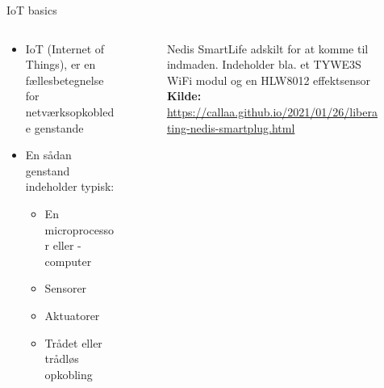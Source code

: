 \documentclass[aspectratio=169]{beamer}
\begin{document}
\begin{frame}{IoT basics}
\begin{columns}
	\begin{column}{0.6\textwidth}
		\begin{textBox}
			\begin{itemize}
				\item IoT (Internet of Things), er en fællesbetegnelse for netværksopkoblede genstande
				\item En sådan genstand indeholder typisk:
				\begin{itemize}
					\item En microprocessor eller -computer
					\item Sensorer
					\item Aktuatorer
					\item Trådet eller trådløs opkobling
				\end{itemize}
			\end{itemize}
		\end{textBox}
	\end{column}
	\begin{column}{0.4\textwidth}
		\centering
		\begin{figure}
			\captionsetup{format=tcbcaptionminmargin}
  			\caption{Nedis SmartLife adskilt for at komme til indmaden. Indeholder bla. et TYWE3S WiFi modul og en HLW8012 effektsensor
  			\captionline \textbf{Kilde:} \url{https://callaa.github.io/2021/01/26/liberating-nedis-smartplug.html}}
  			\label{fig:iot-device}
		\end{figure}
	\end{column}
\end{columns}
\end{frame}
\end{document}
